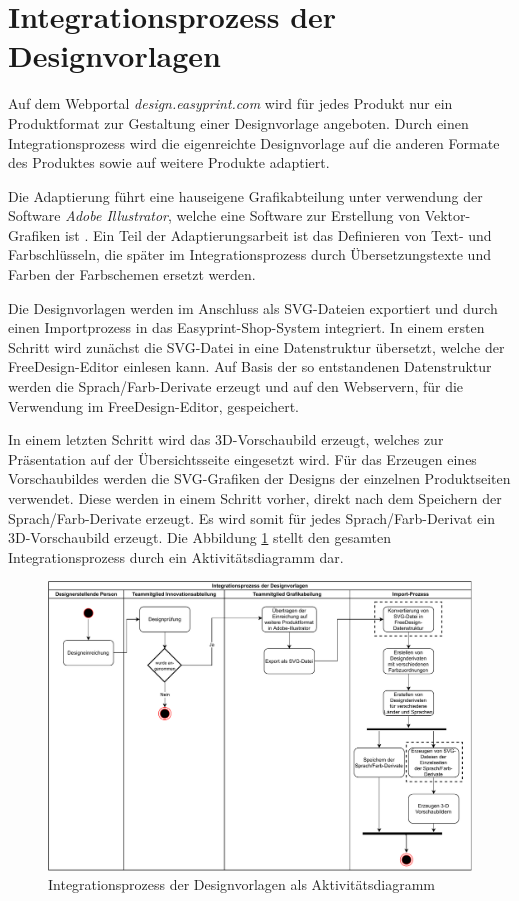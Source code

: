 \section{Integrationsprozess der Designvorlagen}
Auf dem Webportal \emph{design.easyprint.com} wird für jedes Produkt nur ein Produktformat zur Gestaltung einer Designvorlage angeboten. Durch einen Integrationsprozess wird die eigenreichte Designvorlage auf die anderen Formate des Produktes sowie auf weitere Produkte adaptiert.

Die Adaptierung führt eine hauseigene Grafikabteilung unter verwendung der Software \emph{Adobe Illustrator}, welche eine Software zur Erstellung von Vektor-Grafiken ist \autocite[vgl.][]{Adobe:Illustrator}. 
Ein Teil der Adaptierungsarbeit ist das Definieren von Text- und Farbschlüsseln, die später im Integrationsprozess durch Übersetzungstexte und Farben der Farbschemen ersetzt werden. 

Die Designvorlagen werden im Anschluss als SVG-Dateien exportiert und durch einen Importprozess in das Easyprint-Shop-System integriert. 
In einem ersten Schritt wird zunächst die SVG-Datei in eine Datenstruktur übersetzt, welche der FreeDesign-Editor einlesen kann. Auf Basis der so entstandenen  
Datenstruktur werden die Sprach/Farb-Derivate erzeugt und auf den Webservern, für die Verwendung im FreeDesign-Editor, gespeichert.  

In einem letzten Schritt wird das 3D-Vorschaubild erzeugt, welches zur Präsentation auf der Übersichtsseite eingesetzt wird. Für das Erzeugen eines Vorschaubildes werden die SVG-Grafiken der Designs der einzelnen Produktseiten verwendet. 
Diese werden in einem Schritt vorher, direkt nach dem Speichern der Sprach/Farb-Derivate erzeugt. Es wird somit für jedes Sprach/Farb-Derivat ein 3D-Vorschaubild erzeugt.
Die Abbildung \ref{fig:Vorlagenimport} stellt den gesamten Integrationsprozess durch ein Aktivitätsdiagramm dar.

\begin{figure}[H]
    \centering
    \includegraphics[width=.98\textwidth]{diagrams/FreeDesign-Vorlagenerstellung.pdf}
\caption{Integrationsprozess der Designvorlagen als Aktivitätsdiagramm}
\label{fig:Vorlagenimport}
\end{figure}

